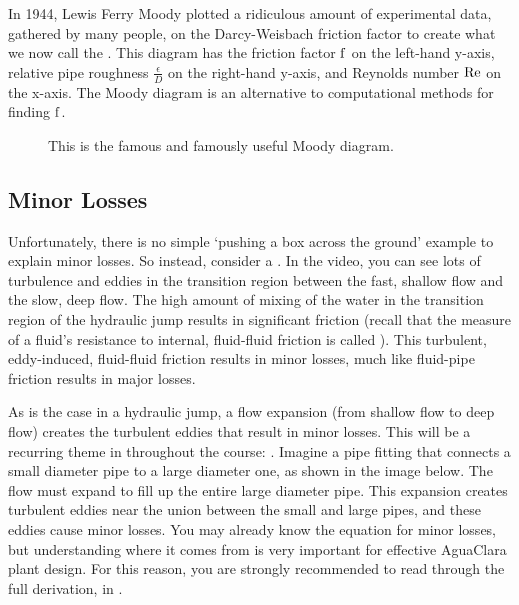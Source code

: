 \documentclass[letterpaper,10pt,english]{sphinxmanual}
\let\sphinxpxdimen\pdfpxdimen\else\newdimen\sphinxpxdimen
\begin{document}
In 1944, Lewis Ferry Moody plotted a ridiculous amount of experimental data, gathered by many people, on the Darcy-Weisbach friction factor to create what we now call the . This diagram has the friction factor \(\rm{f}\) on the left-hand y-axis, relative pipe roughness \(\frac{\epsilon}{D}\) on the right-hand y-axis, and Reynolds number \(\rm{Re}\) on the x-axis. The Moody diagram is an alternative to computational methods for finding \(\rm{f}\).

\begin{figure}[htbp]
\centering
\capstart

\noindent\sphinxincludegraphics[width=650\sphinxpxdimen]{{Moody}.jpg}
\caption{This is the famous and famously useful Moody diagram.}\label{\detokenize{Fluids_Review/Fluids_Review_Design:id17}}\label{\detokenize{Fluids_Review/Fluids_Review_Design:moody}}\end{figure}


\subsection{Minor Losses}
\label{\detokenize{Fluids_Review/Fluids_Review_Design:minor-losses}}\label{\detokenize{Fluids_Review/Fluids_Review_Design:id8}}
Unfortunately, there is no simple ‘pushing a box across the ground’ example to explain minor losses. So instead, consider a . In the video, you can see lots of turbulence and eddies in the transition region between the fast, shallow flow and the slow, deep flow. The high amount of mixing of the water in the transition region of the hydraulic jump results in significant friction  (recall that the measure of a fluid’s resistance to internal, fluid-fluid friction is called ). This turbulent, eddy-induced, fluid-fluid friction results in minor losses, much like fluid-pipe friction results in major losses.

As is the case in a hydraulic jump, a flow expansion (from shallow flow to deep flow) creates the turbulent eddies that result in minor losses. This will be a recurring theme in throughout the course: . Imagine a pipe fitting that connects a small diameter pipe to a large diameter one, as shown in the image below. The flow must expand to fill up the entire large diameter pipe. This expansion creates turbulent eddies near the union between the small and large pipes, and these eddies cause minor losses. You may already know the equation for minor losses, but understanding where it comes from is very important for effective AguaClara plant design. For this reason, you are strongly recommended to read through the full derivation, in {\hyperref[\detokenize{Fluids_Review/Fluids_Review_Derivations:fluids-review-derivations}]{}}.
\end{document}
